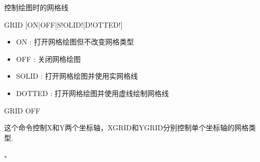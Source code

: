 \label{cmd:grid}

控制绘图时的网格线

\begin{SACSTX}
GRID [ON|OFF|S!OLID!|D!OTTED!]
\end{SACSTX}

\begin{itemize}
\item ON : 打开网格绘图但不改变网格类型
\item OFF : 关闭网格绘图 
\item SOLID : 打开网格绘图并使用实网格线 
\item DOTTED : 打开网格绘图并使用虚线绘制网格线 
\end{itemize}

\begin{SACDFT}
GRID OFF
\end{SACDFT}

这个命令控制X和Y两个坐标轴，XGRID和YGRID分别控制单个坐标轴的网格类型.

、
